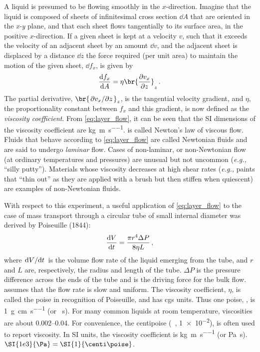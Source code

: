 \documentclass[nobib,nofonts,nols,nohyper]{tufte-handout}
\begin{document}
A liquid is presumed to be flowing smoothly in the \( x \)-direction. 
Imagine that the liquid is composed of sheets of infinitesimal cross section \( \dd{A} \) that are oriented in the \emph{x-y} plane, and that each sheet flows tangentially to its surface area, in the positive \( x \)-direction. 
If a given sheet is kept at a velocity \( v \), such that it exceeds the velocity of an adjacent sheet by an amount \( \dd{v} \), and the adjacent sheet is displaced by a distance \( \dd{z} \) the force required (per unit area) to maintain the motion of the given sheet, \( \dd{f_x} \), is given by
\begin{equation}
	\dv{f_x}{A} = \eta \br{ \pdv{v_x}{z}}_z \, .
	\label{eq:layer_flow}
\end{equation}
The partial derivative, \( \br{\pdv*{v_x}{z}}_z \), is the tangential velocity gradient, and \( \eta \), the proportionality constant between \( f_x \) and this gradient, is now defined as the \emph{viscosity coefficient}. 
From \cref{eq:layer_flow}, it can be seen that the SI dimensions of the viscosity coefficient are \si{\kg \per \m \per \s}.  is called Newton's law of viscous flow. 
Fluids that behave according to \cref{eq:layer_flow} are called Newtonian fluids and are said to undergo \emph{laminar} flow. 
Cases of non-laminar, or non-Newtonian flow (at ordinary temperatures and pressures) are unusual but not uncommon (\emph{e.g.,} ``silly putty'').
Materials whose viscosity decreases at high shear rates (\emph{e.g.,} paints that ``thin out'' as they are applied with a brush but then stiffen when quiescent) are examples of non-Newtonian fluids.

With respect to this experiment, a useful application of \cref{eq:layer_flow} to the case of mass transport through a circular tube of small internal diameter was derived by Poiseuille (1844):
\begin{equation}
	\dv{V}{t} = \frac{\pi r^4 \Delta P}{8 \eta L} \, ,
	\label{eq:tube_flow}
\end{equation}
where \( \dv*{V}{t} \) is the volume flow rate of the liquid emerging from the tube, and \( r \) and \( L \) are, respectively, the radius and length of the tube.
\( \Delta P \) is the pressure difference across the ends of the tube and is the driving force for the bulk flow. 
 assumes that the flow rate is slow and uniform. 
The viscosity coefficient, \( \eta \), is called the poise in recognition of Poiseuille, and has cgs units. 
Thus one poise, \si{\poise}, is \SI{1}{\g \per \cm \per \s} (or \si{\dyne \s}). 
For many common liquids at room temperature, viscosities are about \SIrange{0.002}{0.04}{\poise}. 
For convenience, the centipoise (\si{\centi\poise}, \SI{1e-2}{\poise}), is often used to report viscosity. 
In SI units, the viscosity coefficient is \si{\kg \per\m \per\s} (or \si{\Pa \s}). 
\( \SI{1e3}{\Pa} = \SI{1}{\centi\poise} \).
\end{document}
